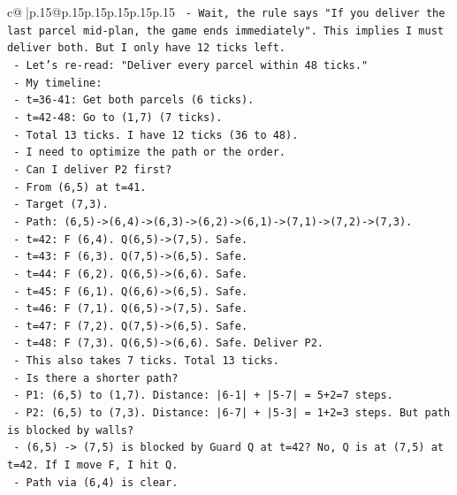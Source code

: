 \documentclass{article}
\begin{document}
{\begin{supertabular}{c@{$\;$}|p{.15\linewidth}@{}p{.15\linewidth}p{.15\linewidth}p{.15\linewidth}p{.15\linewidth}p{.15\linewidth}}
{{{\texttt{    {-} Wait, the rule says "If you deliver the last parcel mid{-}plan, the game ends immediately". This implies I must deliver both. But I only have 12 ticks left.} \\
\texttt{    {-} Let's re{-}read: "Deliver every parcel within 48 ticks."} \\
\texttt{    {-} My timeline:} \\
\texttt{      {-} t=36{-}41: Get both parcels (6 ticks).} \\
\texttt{      {-} t=42{-}48: Go to (1,7) (7 ticks).} \\
\texttt{      {-} Total 13 ticks. I have 12 ticks (36 to 48).} \\
\texttt{      {-} I need to optimize the path or the order.} \\
\texttt{    {-} Can I deliver P2 first?} \\
\texttt{      {-} From (6,5) at t=41.} \\
\texttt{      {-} Target (7,3).} \\
\texttt{      {-} Path: (6,5){-}>(6,4){-}>(6,3){-}>(6,2){-}>(6,1){-}>(7,1){-}>(7,2){-}>(7,3).} \\
\texttt{      {-} t=42: F (6,4). Q(6,5){-}>(7,5). Safe.} \\
\texttt{      {-} t=43: F (6,3). Q(7,5){-}>(6,5). Safe.} \\
\texttt{      {-} t=44: F (6,2). Q(6,5){-}>(6,6). Safe.} \\
\texttt{      {-} t=45: F (6,1). Q(6,6){-}>(6,5). Safe.} \\
\texttt{      {-} t=46: F (7,1). Q(6,5){-}>(7,5). Safe.} \\
\texttt{      {-} t=47: F (7,2). Q(7,5){-}>(6,5). Safe.} \\
\texttt{      {-} t=48: F (7,3). Q(6,5){-}>(6,6). Safe. Deliver P2.} \\
\texttt{      {-} This also takes 7 ticks. Total 13 ticks.} \\
\texttt{    {-} Is there a shorter path?} \\
\texttt{      {-} P1: (6,5) to (1,7). Distance: |6{-}1| + |5{-}7| = 5+2=7 steps.} \\
\texttt{      {-} P2: (6,5) to (7,3). Distance: |6{-}7| + |5{-}3| = 1+2=3 steps. But path is blocked by walls?} \\
\texttt{        {-} (6,5) {-}> (7,5) is blocked by Guard Q at t=42? No, Q is at (7,5) at t=42. If I move F, I hit Q.} \\
\texttt{        {-} Path via (6,4) is clear.} \\
}}}
\end{supertabular}}
\end{document}
